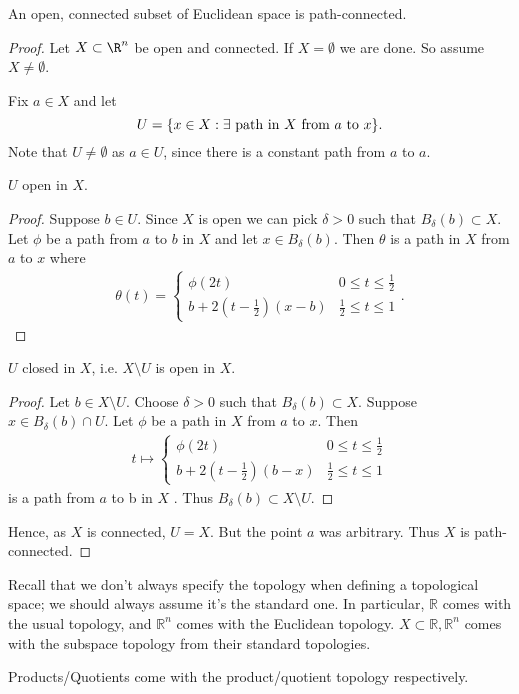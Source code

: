 \begin{proposition} \label{prp:47}
    An open, connected subset of Euclidean space is path-connected.
\end{proposition}

\begin{proof}
    Let $X\subset \R^n$ be open and connected.
    If $X = \emptyset$ we are done.
    So assume $X \neq \emptyset$.

    Fix $a \in X$ and let \[ U = \{x\in X : \exists \textup{ path in } X \textup{ from } a \textup{ to } x\}. \]
    Note that $U\neq \emptyset$ as $a\in U$, since  there is a constant path from $a$ to $a$.

    \begin{claim}
        $U$ open in $X$.
    \end{claim}
    \begin{proof}
    Suppose $b\in U$.
    Since $X$ is open we can pick $\delta > 0$ such that $B_\delta(b) \subset X$.
    Let $\phi$ be a path from $a$ to $b$ in $X$ and let $x \in B_\delta(b)$.
    Then $\theta$ is a path in $X$ from $a$ to $x$ where
    \begin{align*}
        \theta(t) = \begin{cases}
        \phi(2t) & 0\leq t \leq \frac{1}{2}\\
        b + 2(t-\frac{1}{2})(x-b) & \frac{1}{2}\leq t \leq 1
        \end{cases}.
    \end{align*}
\end{proof}

\begin{claim}
    $U$ closed in $X$, i.e. $X\setminus U$ is open in $X$.
\end{claim}

\begin{proof}
    Let $b \in X \setminus U$.
    Choose $\delta> 0$ such that $B_\delta(b) \subset X.$ Suppose $x\in B_\delta (b)\cap U$.
    Let $\phi$ be a path in $X$ from $a$ to $x$. Then
    \begin{align*}
        t \mapsto \begin{cases}
        \phi(2t) & 0\leq t \leq \frac{1}{2}\\
        b + 2(t-\frac{1}{2})(b-x) & \frac{1}{2}\leq t \leq 1
        \end{cases}
    \end{align*}
    is a path from $a$ to b in $X$ \Lightning.
    Thus $B_\delta (b) \subset X\setminus U$.
    \end{proof}
    Hence, as $X$ is connected, $U=X$.
    But the point $a$ was arbitrary.
    Thus $X$ is path-connected.
\end{proof}

\begin{remark}
    Recall that we don't always specify the topology when defining a topological space; we should always assume it's the standard one. In particular, $\mathbb{R}$ comes with the usual topology, and $\mathbb{R}^n$ comes with the Euclidean topology. $X\subset \mathbb{R},\mathbb{R}^n$ comes with the subspace topology from their standard topologies.

    Products/Quotients come with the product/quotient topology respectively.
\end{remark}